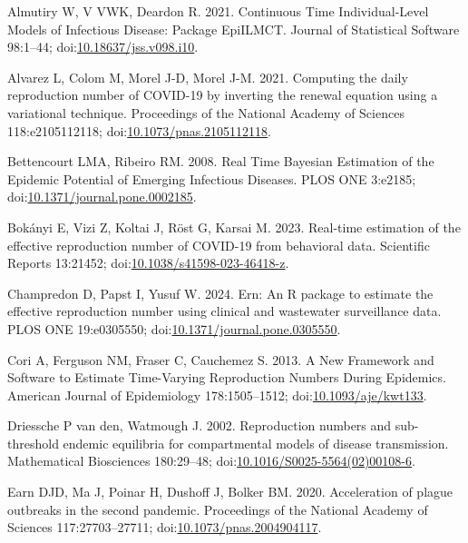 \documentclass[
  letterpaper,
  DIV=11,
  numbers=noendperiod]{scrreprt}
\newlength{\cslhangindent}
\newenvironment{CSLReferences}[2] %
 {\begin{list}{}{%
  \setlength{\itemindent}{0pt}
  \setlength{\leftmargin}{0pt}
  \setlength{\parsep}{0pt}
  \ifodd #1
   \setlength{\leftmargin}{\cslhangindent}
   \setlength{\itemindent}{-1\cslhangindent}
  \fi
  \setlength{\itemsep}{#2\baselineskip}}}
 {\end{list}}
\begin{document}
\label{refs}
\begin{CSLReferences}{1}{1}
Almutiry W, V VWK, Deardon R. 2021. Continuous {Time}
{Individual}-{Level} {Models} of {Infectious} {Disease}: Package
{EpiILMCT}. Journal of Statistical Software 98:1--44;
doi:\href{https://doi.org/10.18637/jss.v098.i10}{10.18637/jss.v098.i10}.

Alvarez L, Colom M, Morel J-D, Morel J-M. 2021. Computing the daily
reproduction number of {COVID}-19 by inverting the renewal equation
using a variational technique. Proceedings of the National Academy of
Sciences 118:e2105112118;
doi:\href{https://doi.org/10.1073/pnas.2105112118}{10.1073/pnas.2105112118}.

Bettencourt LMA, Ribeiro RM. 2008. Real {Time} {Bayesian} {Estimation}
of the {Epidemic} {Potential} of {Emerging} {Infectious} {Diseases}.
PLOS ONE 3:e2185;
doi:\href{https://doi.org/10.1371/journal.pone.0002185}{10.1371/journal.pone.0002185}.

Bokányi E, Vizi Z, Koltai J, Röst G, Karsai M. 2023. Real-time
estimation of the effective reproduction number of {COVID}-19 from
behavioral data. Scientific Reports 13:21452;
doi:\href{https://doi.org/10.1038/s41598-023-46418-z}{10.1038/s41598-023-46418-z}.

Champredon D, Papst I, Yusuf W. 2024. Ern: An {R} package to estimate
the effective reproduction number using clinical and wastewater
surveillance data. PLOS ONE 19:e0305550;
doi:\href{https://doi.org/10.1371/journal.pone.0305550}{10.1371/journal.pone.0305550}.

Cori A, Ferguson NM, Fraser C, Cauchemez S. 2013. A {New} {Framework}
and {Software} to {Estimate} {Time}-{Varying} {Reproduction} {Numbers}
{During} {Epidemics}. American Journal of Epidemiology 178:1505--1512;
doi:\href{https://doi.org/10.1093/aje/kwt133}{10.1093/aje/kwt133}.

Driessche P van den, Watmough J. 2002. Reproduction numbers and
sub-threshold endemic equilibria for compartmental models of disease
transmission. Mathematical Biosciences 180:29--48;
doi:\href{https://doi.org/10.1016/S0025-5564(02)00108-6}{10.1016/S0025-5564(02)00108-6}.

Earn DJD, Ma J, Poinar H, Dushoff J, Bolker BM. 2020. Acceleration of
plague outbreaks in the second pandemic. Proceedings of the National
Academy of Sciences 117:27703--27711;
doi:\href{https://doi.org/10.1073/pnas.2004904117}{10.1073/pnas.2004904117}.


\end{CSLReferences}
\end{document}
